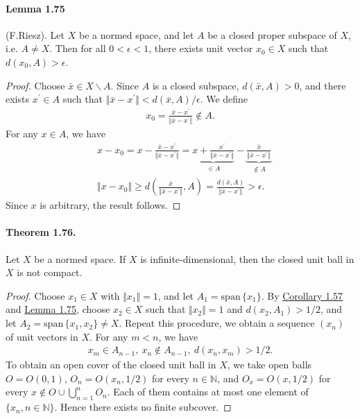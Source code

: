 \documentclass{article}
\begin{document}
\paragraph{Lemma 1.75\label{lemma:1.75}} (F.Riesz). Let $X$ be a normed space, and let $A$ be a closed proper subspace of $X$, i.e. $A\neq X$. Then for all $0<\epsilon<1$, there exists unit vector $x_0\in X$ such that $d(x_0,A)>\epsilon$.
\begin{proof}
Choose $\bar{x}\in X\backslash A$. Since $A$ is a closed subspace, $d(\bar{x},A) > 0$, and there exists $x^\prime\in A$ such that $\Vert\bar{x}-x^\prime\Vert < d(\bar{x},A)/\epsilon$. We define
\begin{align*}
	x_0 = \frac{\bar{x}-x^\prime}{\Vert\bar{x}-x^\prime\Vert}\notin A.
\end{align*}
For any $x\in A$, we have
\begin{align*}
	& x-x_0 = x - \frac{\bar{x}-x^\prime}{\Vert\bar{x}-x^\prime\Vert} = \underbrace{x + \frac{x^\prime}{\Vert\bar{x}-x^\prime\Vert}}_{\in A} - \underbrace{\frac{\bar{x}}{\Vert\bar{x}-x^\prime\Vert}}_{\notin A}\\
	&\Vert x-x_0\Vert \geq d\left(\frac{\bar{x}}{\Vert\bar{x}-x^\prime\Vert}, A\right) = \frac{d\left(\bar{x}, A\right)}{\Vert\bar{x}-x^\prime\Vert} > \epsilon.
\end{align*}
Since $x$ is arbitrary, the result follows.
\end{proof}

\paragraph{Theorem 1.76.\label{thm:1.76}} Let $X$ be a normed space. If $X$ is infinite-dimensional, then the closed unit ball in $X$ is not compact.
\begin{proof}
	Choose $x_1\in X$ with $\Vert x_1\Vert=1$, and let $A_1=\mathrm{span}\,\{x_1\}$. By \hyperref[cor:1.57]{Corollary 1.57} and \hyperref[lemma:1.75]{Lemma 1.75}, choose $x_2\in X$ such that $\Vert x_2\Vert=1$ and $d(x_2,A_1) > 1/2$, and let $A_2=\mathrm{span}\,\{x_1,x_2\}\neq X$. Repeat this procedure, we obtain a sequence $(x_n)$ of unit vectors in $X$. For any $m<n$, we have
	\begin{align*}
		x_m\in A_{n-1},\ x_n\notin A_{n-1},\ d(x_n,x_m) > 1/2.
	\end{align*}
	To obtain an open cover of the closed unit ball in $X$, we take open balls $O=O(0,1)$, $O_n = O(x_n,1/2)$ for every $n\in\mathbb{N}$, and $O_x = O(x,1/2)$ for every $x\notin O\cup\bigcup_{n=1}^n O_n$. Each of them contains at most one element of $\{x_n,n\in\mathbb{N}\}$. Hence there exists no finite subcover.
\end{proof}
\end{document}
